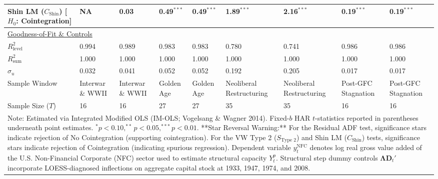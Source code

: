 \begin{landscape}
\begin{table}[H]
\begin{tabular}{p{5.2cm}p{1.5cm}p{1.5cm}p{1.5cm}p{1.5cm}p{1.5cm}p{1.5cm}p{1.5cm}p{1.5cm}}
\makecell[l]{Shin LM ($C_{\text{Shin}}$) \\ {\scriptsize [$H_0$: Cointegration]}} & NA & 0.03 & 0.49$^{***}$ & 0.49$^{***}$ & 1.89$^{***}$ & 2.16$^{***}$ & 0.19$^{***}$ & 0.19$^{***}$  \\
\midrule
\multicolumn{9}{l}{\underline{Goodness-of-Fit \& Controls}} \\
$R_{\text{level}}^2$ & 0.994 & 0.989 & 0.983 & 0.983 & 0.780 & 0.741 & 0.986 & 0.986  \\
$R_{\text{sum}}^2$ & 1.000 & 1.000 & 1.000 & 1.000 & 1.000 & 1.000 & 1.000 & 1.000  \\
$\hat{\sigma}_u$ & 0.032 & 0.041 & 0.052 & 0.052 & 0.192 & 0.205 & 0.017 & 0.017  \\
Sample Window & Interwar \& WWII & Interwar \& WWII & Golden Age & Golden Age & Neoliberal Restructuring & Neoliberal Restructuring & Post-GFC Stagnation & Post-GFC Stagnation  \\
Sample Size ($T$) & 16 & 16 & 27 & 27 & 35 & 35 & 16 & 16  \\
\bottomrule
\multicolumn{9}{p{18.5cm}}{\footnotesize Note: Estimated via Integrated Modified OLS (IM-OLS; Vogelsang \& Wagner 2014). Fixed-$b$ HAR $t$-statistics reported in parentheses underneath point estimates. $^*p<0.10, ^{**}p<0.05, ^{***}p<0.01$. **Star Reversal Warning:** For the Residual ADF test, significance stars indicate rejection of No Cointegration (supporting cointegration). For the VW Type 2 ($S_{\text{Type 2}}$) and Shin LM ($C_{\text{Shin}}$) tests, significance stars indicate rejection of Cointegration (indicating spurious regression). Dependent variable $y_t^{\text{NFC}}$ denotes log real gross value added of the U.S. Non-Financial Corporate (NFC) sector used to estimate structural capacity $Y_t^p$. Structural step dummy controls $\boldsymbol{\Lambda} \mathbf{D}_t'$ incorporate LOESS-diagnosed inflections on aggregate capital stock at 1933, 1947, 1974, and 2008.}
\end{tabular}
\end{table}
\end{landscape}
